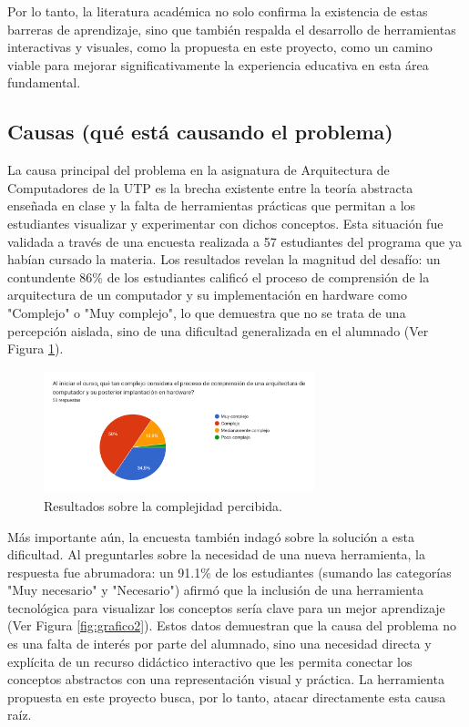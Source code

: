 \documentclass[12pt, letterpaper]{article}
\begin{document}
Por lo tanto, la literatura académica no solo confirma la existencia de estas barreras de aprendizaje, sino que también respalda el desarrollo de herramientas interactivas y visuales, como la propuesta en este proyecto, como un camino viable para mejorar significativamente la experiencia educativa en esta área fundamental.

\subsection{Causas (qué está causando el problema)}
La causa principal del problema en la asignatura de Arquitectura de Computadores de la UTP es la brecha existente entre la teoría abstracta enseñada en clase y la falta de herramientas prácticas que permitan a los estudiantes visualizar y experimentar con dichos conceptos. Esta situación fue validada a través de una encuesta realizada a 57 estudiantes del programa que ya habían cursado la materia. Los resultados revelan la magnitud del desafío: un contundente 86\% de los estudiantes calificó el proceso de comprensión de la arquitectura de un computador y su implementación en hardware como "Complejo" o "Muy complejo", lo que demuestra que no se trata de una percepción aislada, sino de una dificultad generalizada en el alumnado (Ver Figura \ref{fig:grafico1}).

\begin{figure}[h!]
    \centering
    \includegraphics[width=0.7\textwidth]{figura1.png}
    \caption{Resultados sobre la complejidad percibida.}
    \label{fig:grafico1}
\end{figure}

Más importante aún, la encuesta también indagó sobre la solución a esta dificultad. Al preguntarles sobre la necesidad de una nueva herramienta, la respuesta fue abrumadora: un 91.1\% de los estudiantes (sumando las categorías "Muy necesario" y "Necesario") afirmó que la inclusión de una herramienta tecnológica para visualizar los conceptos sería clave para un mejor aprendizaje (Ver Figura  \ref{fig:grafico2}). Estos datos demuestran que la causa del problema no es una falta de interés por parte del alumnado, sino una necesidad directa y explícita de un recurso didáctico interactivo que les permita conectar los conceptos abstractos con una representación visual y práctica. La herramienta propuesta en este proyecto busca, por lo tanto, atacar directamente esta causa raíz.
\end{document}

